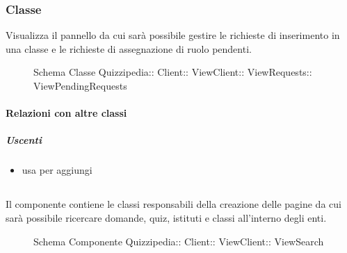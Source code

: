 \subsubsection{Classe }
Visualizza il pannello da cui sarà possibile gestire le richieste di inserimento in una classe e le richieste di assegnazione di ruolo pendenti.
\begin{figure}[H]
\centering
\noindent{}
\caption[Schema Classe ViewPendingRequests]{Schema Classe Quizzipedia:: Client:: ViewClient:: ViewRequests:: ViewPendingRequests}
\end{figure}
\paragraph{Relazioni con altre classi}
\subparagraph{Uscenti}
\begin{itemize}
\item usa  per aggiungi
\end{itemize}
\subsection{}
Il componente contiene le classi responsabili della creazione delle pagine da cui sarà possibile ricercare domande, quiz, istituti e classi all'interno degli enti.
\begin{figure}[H]
\centering
\noindent{}
\caption[Schema Componente ViewSearch]{Schema Componente Quizzipedia:: Client:: ViewClient:: ViewSearch}
\end{figure}
